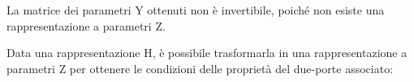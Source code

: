 \documentclass{article}
\numberwithin{equation}{subsection}
\begin{document}
La matrice dei parametri Y ottenuti non è invertibile, poiché non esiste una rappresentazione a parametri Z.

Data una rappresentazione H, è possibile trasformarla in una rappresentazione a parametri Z per ottenere le condizioni delle proprietà del due-porte associato:
%
%
\end{document}
